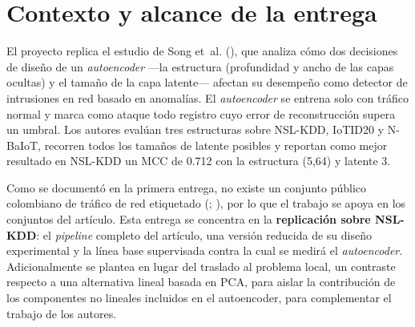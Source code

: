 \documentclass[
  spanish,
  11pt,
]{article}
\begin{document}
\begin{titlepage}
\vspace{1.2cm}


\end{titlepage}


\section{Contexto y alcance de la entrega}\label{sec:contexto}

El proyecto replica el estudio de Song et~al. (), que analiza cómo dos decisiones de diseño de
un \emph{autoencoder} ---la estructura (profundidad y ancho de las capas ocultas) y el tamaño de la capa
latente--- afectan su desempeño como detector de intrusiones en red basado en anomalías. El
\emph{autoencoder} se entrena solo con tráfico normal y marca como ataque todo registro cuyo error de
reconstrucción supera un umbral. Los autores evalúan tres estructuras sobre NSL-KDD, IoTID20 y
N-BaIoT, recorren todos los tamaños de latente posibles y reportan como mejor resultado en NSL-KDD un
MCC de 0.712 con la estructura (5,64) y latente 3.

Como se documentó en la primera entrega, no existe un conjunto público colombiano de tráfico de red
etiquetado (; ), por lo que el trabajo se apoya en los conjuntos del
artículo. Esta entrega se concentra en la \textbf{replicación sobre NSL-KDD}: el \emph{pipeline} completo del
artículo, una versión reducida de su diseño experimental y la línea base supervisada contra la cual se
medirá el \emph{autoencoder}. Adicionalmente se plantea en lugar del traslado al problema local, un contraste respecto a una alternativa lineal basada en PCA, para aislar la contribución de los componentes no lineales incluidos en el autoencoder, para complementar el trabajo de los autores.
\end{document}
